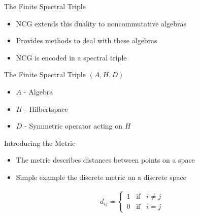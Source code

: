\documentclass[fleqn]{beamer}
\begin{document}
    \begin{frame}{The Finite Spectral Triple}
        \begin{itemize}
            \item NCG extends this duality to noncommutative algebras
            \item Provides methods to deal with these algebras
            \item NCG is encoded in a spectral triple
        \end{itemize}
        \begin{block}
            {\centering The Finite Spectral Triple}
            \centering
            $(A, H, D)$
        \end{block}
        \begin{itemize}
            \item $A$ - Algebra
            \item $H$ - Hilbertspace
            \item $D$ - Symmetric operator acting on $H$
        \end{itemize}
    \end{frame}

    \begin{frame}{Introducing the Metric}
        \begin{itemize}
            \item The metric describes distances between points on a space
            \item Simple example the discrete metric on a discrete space
        \end{itemize}
        \centering
            \begin{align*}
                d_{ij} =
                \begin{cases}
                    1\;\;\; \text{if}\;\;\; i \neq j \\
                    0\;\;\; \text{if}\;\;\; i = j
                \end{cases}
            \end{align*}
            \begin{figure}[h!] \centering
            \end{figure}
    \end{frame}
\end{document}
